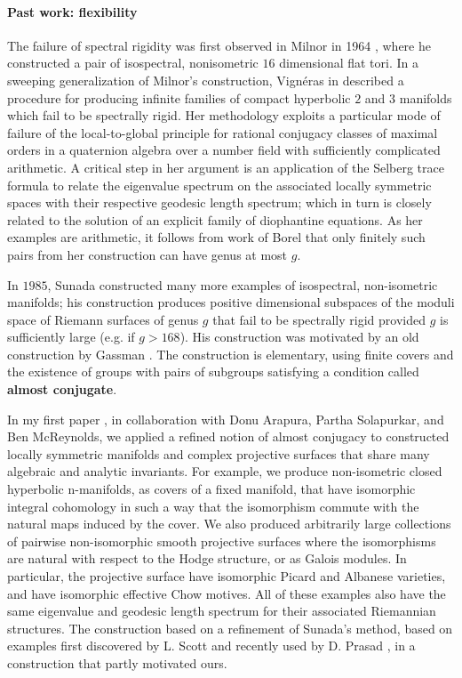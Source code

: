\documentclass[12pt]{article}
\begin{document}
\paragraph{Past work: flexibility} The failure of spectral rigidity was first observed in Milnor in 1964 \cite{milnor1964}, where he constructed a pair of isospectral, nonisometric $16$ dimensional flat tori. In a sweeping generalization of Milnor's construction,  Vignéras in \cite{vigneras1980}  described a procedure for producing infinite families of compact hyperbolic $2$ and $3$  manifolds which fail to be spectrally rigid. Her methodology  exploits  a  particular mode of failure of the local-to-global principle for rational conjugacy classes of maximal orders in a quaternion algebra over a number field with sufficiently complicated arithmetic.  A critical step in her argument is an application of the Selberg trace formula to relate the eigenvalue spectrum on the associated locally symmetric spaces with their respective geodesic length spectrum; which in turn is closely related to the solution of an explicit family of diophantine equations.  As her examples are arithmetic, it follows from work of Borel \cite{borel1989} that only finitely such pairs from her construction can have genus at most $g$.

In $1985$, Sunada \cite{sunada1985}  constructed many more examples of isospectral, non-isometric manifolds; his construction produces positive dimensional subspaces of the moduli space of Riemann surfaces of genus $g$ that fail to be spectrally rigid provided $g$ is sufficiently large (e.g. if $g > 168$). His construction was motivated by an old construction by Gassman \cite{gassmann1926}. The
construction is elementary, using finite covers and the existence of groups with pairs of subgroups satisfying a condition called {\bf almost conjugate}. 

In my first paper \cite{arapura2019} , in collaboration with Donu Arapura, Partha Solapurkar, and Ben McReynolds, we applied a refined notion of almost conjugacy to  constructed locally symmetric manifolds and complex projective surfaces that share many algebraic and analytic invariants. For example, we produce non-isometric closed hyperbolic n-manifolds, as covers of a fixed manifold, that have isomorphic integral cohomology in such a way that the isomorphism commute with the natural maps induced by the cover. We also produced arbitrarily large collections of pairwise non-isomorphic smooth projective surfaces where the isomorphisms are natural with respect to the Hodge structure, or as Galois modules. In particular, the projective surface have isomorphic Picard and Albanese varieties, and have isomorphic effective Chow motives. All of these examples also have the same eigenvalue and geodesic length spectrum for their associated Riemannian structures. The construction based on a refinement of Sunada's method, based on examples first discovered by L. Scott \cite{MR1348907}   and recently used by D. Prasad \cite{MR3635810}, in a construction that partly motivated ours.
\end{document}
